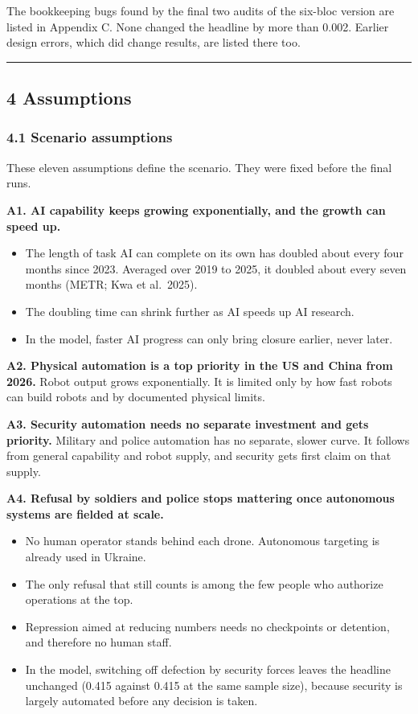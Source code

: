 \documentclass[
  10pt,
]{article}
\providecommand{\tightlist}{%
  \setlength{\itemsep}{0pt}\setlength{\parskip}{0pt}}
\begin{document}
The bookkeeping bugs found by the final two audits of the six-bloc version are listed in Appendix C.
None changed the headline by more than 0.002. Earlier design errors, which did change results, are
listed there too.

\begin{center}\rule{0.5\linewidth}{0.5pt}\end{center}

\subsection{4 Assumptions}\label{assumptions}

\subsubsection{4.1 Scenario assumptions}\label{scenario-assumptions}

These eleven assumptions define the scenario. They were fixed before the final runs.

\textbf{A1. AI capability keeps growing exponentially, and the growth can speed up.}

\begin{itemize}
\tightlist
\item
  The length of task AI can complete on its own has doubled about every four months since 2023.
  Averaged over 2019 to 2025, it doubled about every seven months (METR; Kwa et al.~2025).
\item
  The doubling time can shrink further as AI speeds up AI research.
\item
  In the model, faster AI progress can only bring closure earlier, never later.
\end{itemize}

\textbf{A2. Physical automation is a top priority in the US and China from 2026.} Robot output grows
exponentially. It is limited only by how fast robots can build robots and by documented physical
limits.

\textbf{A3. Security automation needs no separate investment and gets priority.} Military and police
automation has no separate, slower curve. It follows from general capability and robot supply, and
security gets first claim on that supply.

\textbf{A4. Refusal by soldiers and police stops mattering once autonomous systems are fielded at
scale.}

\begin{itemize}
\tightlist
\item
  No human operator stands behind each drone. Autonomous targeting is already used in Ukraine.
\item
  The only refusal that still counts is among the few people who authorize operations at the top.
\item
  Repression aimed at reducing numbers needs no checkpoints or detention, and therefore no human
  staff.
\item
  In the model, switching off defection by security forces leaves the headline unchanged (0.415
  against 0.415 at the same sample size), because security is largely automated before any decision
  is taken.
\end{itemize}
\end{document}
